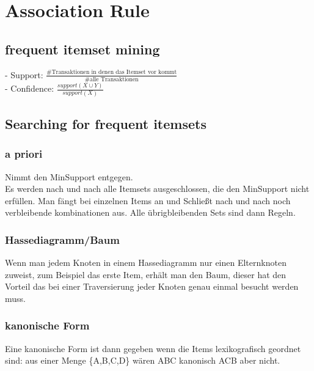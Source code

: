 \documentclass[a4paper]{scrartcl}
\begin{document}
\section{Association Rule}
\subsection{frequent itemset mining}
- Support: $\frac{\mbox{\#Transaktionen in denen das Itemset vor kommt}}{\mbox{\#alle Transaktionen}}$ \\
- Confidence: $\frac{support(X \cup Y)}{support(X)}$
\subsection{Searching for frequent itemsets}
\subsubsection{a priori}
Nimmt den MinSupport entgegen.\\
Es werden nach und nach alle Itemsets ausgeschlossen, die den MinSupport nicht erfüllen. Man fängt bei einzelnen Items an und Schließt nach und nach noch verbleibende kombinationen aus. Alle übrigbleibenden Sets sind dann Regeln.

\subsubsection{Hassediagramm/Baum}
Wenn man jedem Knoten in einem Hassediagramm nur einen Elternknoten zuweist, zum Beispiel das erste Item, erhält man den Baum, dieser hat den Vorteil das bei einer Traversierung jeder Knoten genau einmal besucht werden muss.
\subsubsection{kanonische Form}
Eine kanonische Form ist dann gegeben wenn die Items lexikografisch geordnet sind: aus einer Menge \{A,B,C,D\} wären ABC kanonisch ACB aber nicht.
\end{document}
